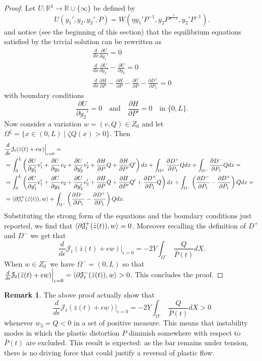 \documentclass[a4paper,10pt,oneside]{amsbook}
\numberwithin{section}{chapter}
\numberwithin{equation}{chapter}
\theoremstyle{definition}
\newtheorem{rmk}[prop]{Remark}
\DeclarePairedDelimiter{\dual}{\langle}{\rangle}
\newcommand{\dind}[2]{\frac{\partial #1}{\partial #2}}
\begin{document}
\begin{proof}
Let $U\colon\mathbb{R}^4\to\mathbb{R}\cup\{\infty\}$ be defined by
\[
U(y_1',y_2,y_2',P)=W(\eta y_1'P^{-1},y_2P^\frac{1}{d-1},y_2'P^{-1}).
\]
and notice (see the beginning of this section) that the equilibrium equations satisfied by the trivial solution can be rewritten as
\begin{gather}
\frac{d}{dx}\dind{U}{y_1'}=0 \\
\frac{d}{dx}\dind{U}{y_2'}-\dind{U}{y_2}=0 \\
\frac{d}{dx}\dind{H}{P}-\dind{H}{P}-\dind{U}{P}-\dind{D^+}{P_1}=0
\end{gather}
with boundary conditions
\[
\dind{U}{y_2'}=0\quad\text{and}\quad\dind{H}{P'}=0\quad\text{in $\{0,L\}$}.
\]
Now consider a variation $w=(v,Q)\in Z_0$ and let $\Omega^\zeta=\{x\in(0,L)\;|\;\zeta Q(x)>0\}$. Then
\[
\begin{multlined}
\frac{d}{d\epsilon}\mathcal{J}_t(\bar z(t)+\epsilon w)\Big|_{\epsilon=0}=\\
\begin{split}
&=\int_0^L\left(\dind{U}{y_1'}v_1'+\dind{U}{y_2}v_2+\dind{U}{y_2'}v_2'+\dind{H}{P}Q+\dind{H}{P'}Q'\right)dx+\int_{\Omega^+}\dind{D^+}{P_1}Qdx+\int_{\Omega^-}\dind{D^-}{P_1}Qdx=\\
&=\int_0^L\left(\dind{U}{y_1'}v_1'+\dind{U}{y_2}v_2+\dind{U}{y_2'}v_2'+\dind{H}{P}Q+\dind{H}{P'}Q'+\dind{D^+}{P_1}Q\right)dx+\int_{\Omega^-}\left(\dind{D^-}{P_1}-\dind{D^+}{P_1}\right)Qdx=\\
&=\dual{\partial\mathcal{J}^+_t(\bar z(t)),w}+\int_{\Omega^-}\left(\dind{D^-}{P_1}-\dind{D^+}{P_1}\right)Qdx.
\end{split}
\end{multlined}
\]
Substituting the strong form of the equations and the boundary conditions just reported, we find that $\dual{\partial\mathcal{J}^+_t(\bar z(t)),w}=0$. Moreover recalling the definition of $D^+$ and $D^-$ we get that
\[
\frac{d}{d\epsilon}\mathcal{J}_t(\bar z(t)+\epsilon w)\Big|_{\epsilon=0}=-2Y\int_{\Omega^-}\frac{Q}{\bar P(t)}dX.
\]
When $w\in Z_0^-$ we have $\Omega^-=(0,L)$ so that $\frac{d}{d\epsilon}\mathcal{J}_t(\bar z(t)+\epsilon w)\Big|_{\epsilon=0}=\dual{\partial\mathcal{J}_t^-(\bar z(t)),w}>0$. This concludes the proof.
\end{proof}
\begin{rmk}
The above proof actually show that
\[
\frac{d}{d\epsilon}\mathcal{J}_t(\bar z(t)+\epsilon w)\Big|_{\epsilon=0}=-2Y\int_{\Omega^-}\frac{Q}{\bar P(t)}dX>0
\]
whenever $w_3=Q<0$ in a set of positive measure. This means that instability modes in which the plastic distortion $P$ diminish somewhere with respect to $\bar P(t)$ are excluded. This result is expected: as the bar remains under tension, there is no driving force that could justify a reversal of plastic flow.
\end{rmk}
\end{document}
